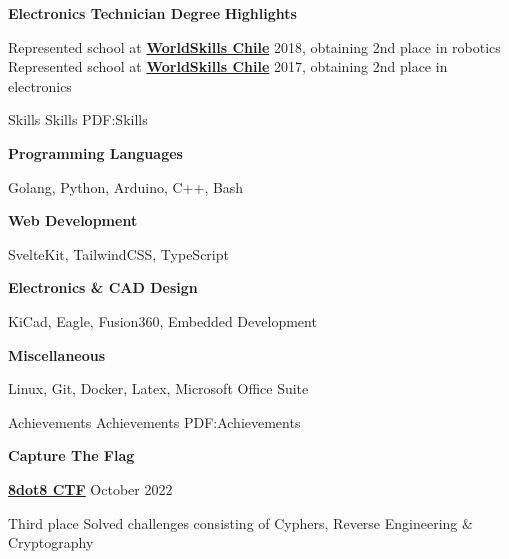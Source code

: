 \documentclass[letterpaper,yyyy,draft]{simpleresumecv}
\begin{document}
\begin{Body}
{    \Gap
    \BulletItem
    \textbf{Electronics Technician Degree}
    \BigGap
    \BulletItem
    \textbf{Highlights}
    \begin{Detail}
    \SubBulletItem
    Represented school at \href{https://worldskills.org/}{\textbf{WorldSkills Chile}} 2018, obtaining 2nd place in robotics
    \SubBulletItem
    Represented school at \href{https://worldskills.org/}{\textbf{WorldSkills Chile}} 2017, obtaining 2nd place in electronics
    \end{Detail}
}


\Section
{Skills}
{Skills}
{PDF:Skills}
{
    {
        \Gap
        \BulletItem
        \textbf{Programming Languages}
        \hfill
        \begin{Detail}
        \Item
        Golang, Python, Arduino, C++, Bash
        \end{Detail}
    }

    {
        \BigGap
        \BulletItem
        \textbf{Web Development}
        \hfill
        \begin{Detail}
        \Item
        SvelteKit, TailwindCSS, TypeScript
        \end{Detail}
    }

    {
        \BigGap
        \BulletItem
        \textbf{Electronics \& CAD Design}
        \hfill
        \begin{Detail}
        \Item
        KiCad, Eagle, Fusion360, Embedded Development
        \end{Detail}
    }

    {
        \BigGap
        \BulletItem
        \textbf{Miscellaneous}
        \hfill
        \begin{Detail}
        \Item
        Linux, Git, Docker, Latex, Microsoft Office Suite
        \end{Detail}
    }
}

\newpage


\Section
{Achievements}
{Achievements}
{PDF:Achievements}
{
    \Gap
    \BulletItem
    \textbf{Capture The Flag}
    {
        \Gap
        \SubBulletItem
        \href{https://8dot8.org}{\textbf{8dot8 CTF}}
        \hfill
        October 2022
        \begin{Detail}
        \SubItem
        Third place \newline
        Solved challenges consisting of \newline Cyphers, Reverse Engineering \& Cryptography
        \end{Detail}
    }

}
\end{Body}
\end{document}
